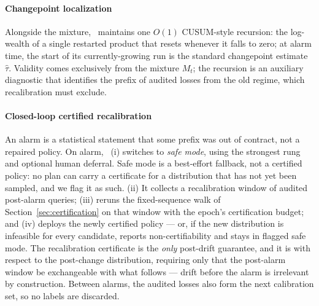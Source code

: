 \paragraph{Changepoint localization}
Alongside the mixture, \system\ maintains one $O(1)$ CUSUM-style
recursion: the log-wealth of a single restarted product that resets
whenever it falls to zero; at alarm time, the start of its
currently-growing run is the standard changepoint estimate $\hat\tau$.
Validity comes exclusively from the mixture $M_t$; the recursion is an
auxiliary diagnostic that identifies the prefix of audited losses from
the old regime, which recalibration must exclude.

\paragraph{Closed-loop certified recalibration}
An alarm is a statistical statement that some prefix was out of
contract, not a repaired policy. On alarm, \system\ (i) switches to
\emph{safe mode}, using the strongest rung and optional human deferral.
Safe mode is a best-effort fallback, not a certified policy:
no plan can carry a certificate for a distribution that has not yet
been sampled, and we flag it as such. (ii) It collects a recalibration
window of audited post-alarm queries; (iii) reruns the fixed-sequence
walk of Section~\ref{sec:certification} on that window with the
epoch's certification budget; and (iv) deploys the newly certified
policy --- or, if the new distribution is infeasible for every
candidate, reports non-certifiability and stays in flagged safe mode.
The recalibration certificate is the \emph{only} post-drift guarantee,
and it is with respect to the post-change distribution, requiring only
that the post-alarm window be exchangeable with what follows --- drift
before the alarm is irrelevant by construction. Between alarms, the
audited losses also form the next calibration set, so no labels are
discarded.

